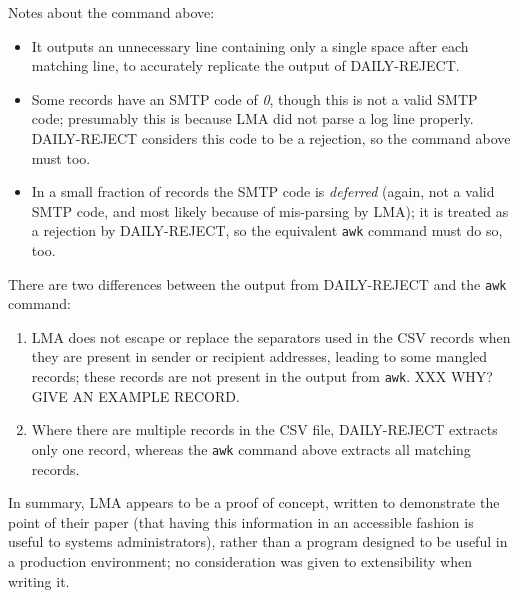 Notes about the command above:

\begin{itemize}

    \item It outputs an unnecessary line containing only a single space
        after each matching line, to accurately replicate the output of
        DAILY-REJECT\@.

    \item Some records have an \gls{SMTP} code of \textit{0}, though this
        is not a valid \gls{SMTP} code; presumably this is because
        \gls{LMA} did not parse a log line properly.  DAILY-REJECT
        considers this code to be a rejection, so the command above must
        too.

    \item In a small fraction of records the \gls{SMTP} code is
        \textit{deferred\/} (again, not a valid \gls{SMTP} code, and most
        likely because of mis-parsing by \gls{LMA}); it is treated as a
        rejection by DAILY-REJECT, so the equivalent \texttt{awk} command
        must do so, too.

\end{itemize}

There are two differences between the output from DAILY-REJECT and the
\texttt{awk} command:

\begin{enumerate}

    \item \gls{LMA} does not escape or replace the separators used in the
        \gls{CSV} records when they are present in sender or recipient
        addresses, leading to some mangled records; these records are not
        present in the output from \texttt{awk}.  XXX WHY\@?  GIVE AN
        EXAMPLE RECORD\@.

    \item Where there are multiple records in the \gls{CSV} file,
        DAILY-REJECT extracts only one record, whereas the \texttt{awk}
        command above extracts all matching records.

\end{enumerate}

In summary, \gls{LMA} appears to be a proof of concept, written to
demonstrate the point of their paper (that having this information in an
accessible fashion is useful to systems administrators), rather than a
program designed to be useful in a production environment; no consideration
was given to extensibility when writing it.

